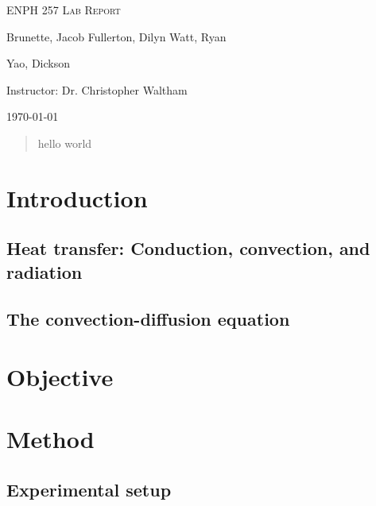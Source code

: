 \documentclass[letterpaper,titlepage,oneside]{report}
\begin{document}
\begin{titlepage}
  \centering
  \vspace*{\fill}
  {\huge\scshape ENPH 257 Lab Report\par}
  \vspace{1cm}
  {\large Brunette, Jacob\quad}
  {\large Fullerton, Dilyn\quad}
  {\large Watt, Ryan\quad}
  {\large Yao, Dickson\par}
  \vspace{1cm}
  {\large Instructor: Dr. Christopher Waltham\par}
  \vspace{1cm}
  {\large \today\par}
  \vspace*{\fill}
  \vfill
\end{titlepage}

\begin{abstract}
  hello world
\end{abstract}

\chapter{Introduction}
\label{ch:intro}

\section{Heat transfer: Conduction, convection, and radiation}

\section{The convection-diffusion equation}

\chapter{Objective}
\label{ch:objective}

\chapter{Method}
\label{ch:method}

\section{Experimental setup}
\end{document}
